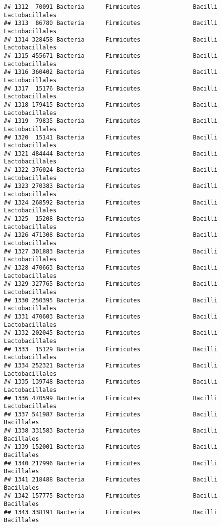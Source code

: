 \documentclass[
]{article}
\begin{document}
\begin{verbatim}
## 1312  70091 Bacteria      Firmicutes               Bacilli     Lactobacillales
## 1313  86780 Bacteria      Firmicutes               Bacilli     Lactobacillales
## 1314 328458 Bacteria      Firmicutes               Bacilli     Lactobacillales
## 1315 455671 Bacteria      Firmicutes               Bacilli     Lactobacillales
## 1316 360402 Bacteria      Firmicutes               Bacilli     Lactobacillales
## 1317  15176 Bacteria      Firmicutes               Bacilli     Lactobacillales
## 1318 179415 Bacteria      Firmicutes               Bacilli     Lactobacillales
## 1319  79835 Bacteria      Firmicutes               Bacilli     Lactobacillales
## 1320  15141 Bacteria      Firmicutes               Bacilli     Lactobacillales
## 1321 484444 Bacteria      Firmicutes               Bacilli     Lactobacillales
## 1322 376024 Bacteria      Firmicutes               Bacilli     Lactobacillales
## 1323 270383 Bacteria      Firmicutes               Bacilli     Lactobacillales
## 1324 268592 Bacteria      Firmicutes               Bacilli     Lactobacillales
## 1325  15208 Bacteria      Firmicutes               Bacilli     Lactobacillales
## 1326 471308 Bacteria      Firmicutes               Bacilli     Lactobacillales
## 1327 301883 Bacteria      Firmicutes               Bacilli     Lactobacillales
## 1328 470663 Bacteria      Firmicutes               Bacilli     Lactobacillales
## 1329 327765 Bacteria      Firmicutes               Bacilli     Lactobacillales
## 1330 250395 Bacteria      Firmicutes               Bacilli     Lactobacillales
## 1331 470603 Bacteria      Firmicutes               Bacilli     Lactobacillales
## 1332 202045 Bacteria      Firmicutes               Bacilli     Lactobacillales
## 1333  15129 Bacteria      Firmicutes               Bacilli     Lactobacillales
## 1334 252321 Bacteria      Firmicutes               Bacilli     Lactobacillales
## 1335 139748 Bacteria      Firmicutes               Bacilli     Lactobacillales
## 1336 470599 Bacteria      Firmicutes               Bacilli     Lactobacillales
## 1337 541987 Bacteria      Firmicutes               Bacilli          Bacillales
## 1338 331583 Bacteria      Firmicutes               Bacilli          Bacillales
## 1339 152001 Bacteria      Firmicutes               Bacilli          Bacillales
## 1340 217996 Bacteria      Firmicutes               Bacilli          Bacillales
## 1341 218488 Bacteria      Firmicutes               Bacilli          Bacillales
## 1342 157775 Bacteria      Firmicutes               Bacilli          Bacillales
## 1343 338191 Bacteria      Firmicutes               Bacilli          Bacillales

\end{verbatim}
\end{document}
